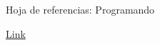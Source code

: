 \begin{frame}{Hoja de referencias: Programando}

\href{file:///Users/moka/Dropbox/0.POST-PHD/GOALS/2.CODE/R/Ecomienza/12Programando/12Programando_cheatsheet.html}{\color{blue} Link}

\end{frame}